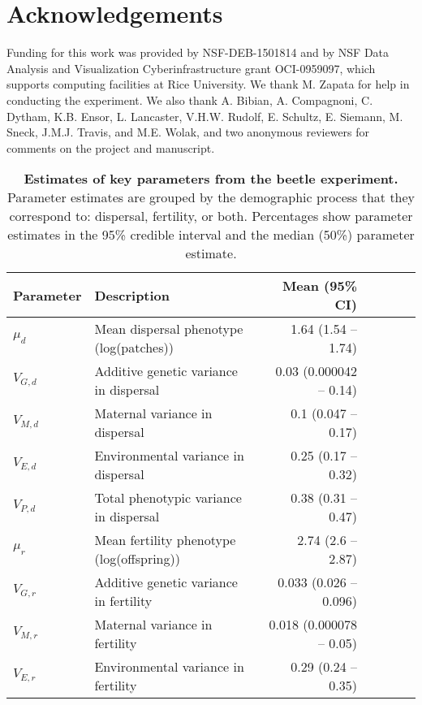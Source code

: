 \documentclass[11pt]{article}
\begin{document}
\section*{Acknowledgements}
Funding for this work was provided by NSF-DEB-1501814 and by NSF Data Analysis and Visualization Cyberinfrastructure grant OCI-0959097, which supports computing facilities at Rice University. We thank M. Zapata for help in conducting the experiment. We also thank A. Bibian, A. Compagnoni, C. Dytham, K.B. Ensor, L. Lancaster, V.H.W. Rudolf, E. Schultz, E. Siemann, M. Sneck, J.M.J. Travis, and M.E. Wolak, and two anonymous reviewers for comments on the project and manuscript.

\renewcommand{\thetable}{\arabic{table}}
\setcounter{table}{0}
\newpage{}
\begin{table}[h]
\centering
\label{Estimates of key parameters from the beetle experiment}
\caption[Estimates of key parameters from the beetle experiment]{\textbf{Estimates of key parameters from the beetle experiment.} Parameter estimates are grouped by the demographic process that they correspond to: dispersal, fertility, or both. Percentages show parameter estimates in the 95\% credible interval and the median (50\%) parameter estimate.}\label{corr:estimates}\vspace{0.1in}
\begin{tabularx}{0.95\linewidth}{lXrrrrr}
\toprule
Parameter   & Description                               & Mean (95\% CI) \\ \midrule
$\mu_{d}$   & Mean dispersal phenotype (log(patches)) & 1.64 (1.54 -- 1.74) \\
$V_{G,d}$   & Additive genetic variance in dispersal &  0.03 (0.000042 -- 0.14)  \\
$V_{M,d}$   & Maternal variance in dispersal    &  0.1 (0.047 -- 0.17)  \\ 
$V_{E,d}$   & Environmental variance in dispersal  &  0.25 (0.17 -- 0.32)  \\ 
$V_{P,d}$   & Total phenotypic variance in dispersal  &  0.38 (0.31 -- 0.47)  \\ \midrule
$\mu_{r}$   & Mean fertility phenotype (log(offspring)) &  2.74 (2.6 -- 2.87)  \\
$V_{G,r}$   & Additive genetic variance in fertility &  0.033 (0.026 -- 0.096)  \\
$V_{M,r}$   & Maternal variance in fertility &  0.018 (0.000078 -- 0.05)  \\
$V_{E,r}$   & Environmental variance in fertility    &  0.29 (0.24 -- 0.35) \\

\end{tabularx}
\end{table}
\end{document}
